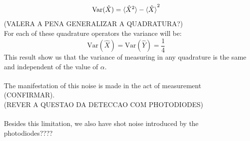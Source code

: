 $$
\textrm{Var}(\hat{X}) = \braket{\hat{X}^2} - \braket{\hat{X}}^2
$$
(VALERA A PENA GENERALIZAR A QUADRATURA?)\\
For each of these quadrature operators the variance will be:
$$
\textrm{Var}(\hat{X}) = \textrm{Var}(\hat{Y}) = \frac{1}{4}
$$
This result show us that the variance of measuring in any quadrature is the same and independent of the value of $\alpha$.\\
\\
The manifestation of this noise is made in the act of measurement (CONFIRMAR).\\
(REVER A QUESTAO DA DETECCAO COM PHOTODIODES)\\
\\
Besides this limitation, we also have shot noise introduced by the photodiodes????
%
%
%
%
\\
\\

